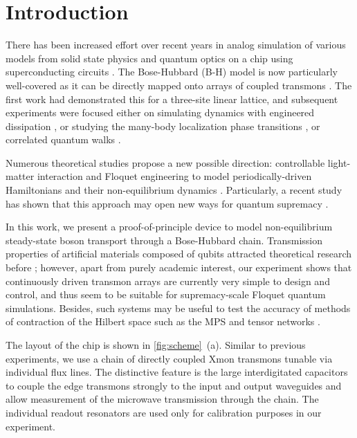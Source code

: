 \documentclass[%
 aps, pra,
 amsmath,amssymb,
 reprint,%
superscriptaddress
]{revtex4-2}
\begin{document}
\maketitle

\section{Introduction}


There has been increased effort over recent years in analog simulation of various models from solid state physics and quantum optics on a chip using superconducting circuits \cite{kjaergaard2019superconducting}. The Bose-Hubbard (B-H) model is now particularly well-covered as it can be directly mapped onto arrays of coupled transmons \cite{orell2019probing}. The first work \cite{hacohen2015cooling} had demonstrated this for a three-site linear lattice, and subsequent experiments were focused either on simulating dynamics with engineered dissipation \cite{ma2019dissipatively}, or studying the many-body localization phase transitions \cite{roushan2017spectroscopic,chiaro2019growth}, or correlated quantum walks \cite{Yan2019, Ye2019}.

Numerous theoretical studies propose a new possible direction: controllable light-matter interaction and Floquet engineering to model periodically-driven Hamiltonians and their non-equilibrium dynamics \cite{Goldman2014, eisert2015quantum, Zippilli2015, kyriienko2018floquet, franca2020simulating}. Particularly, a recent study has shown that this approach may open new ways for quantum supremacy \cite{tangpanitanon2019quantum}.

In this work, we present a proof-of-principle device to model non-equilibrium steady-state boson transport through a Bose-Hubbard chain.  Transmission properties of artificial materials composed of qubits attracted theoretical research before \cite{Zagoskin2016, viehmann2013observing, Greenberg2015, Fistul2019, Biella2015}; however, apart from purely academic interest, our experiment shows that continuously driven transmon arrays are currently very simple to design and control, and thus seem to be suitable for supremacy-scale Floquet quantum simulations. Besides, such systems may be useful to test the accuracy of methods of contraction of the Hilbert space such as the MPS and tensor networks  \cite{Biella2015, orell2019probing}.

The layout of the chip is shown in \autoref{fig:scheme}~(a). Similar to previous experiments, we use a chain of directly coupled Xmon transmons tunable via individual flux lines. The distinctive feature is the large interdigitated capacitors to couple the edge transmons strongly to the input and output waveguides and allow measurement of the microwave transmission through the chain. The individual readout resonators are used only for calibration purposes in our experiment.
\end{document}
